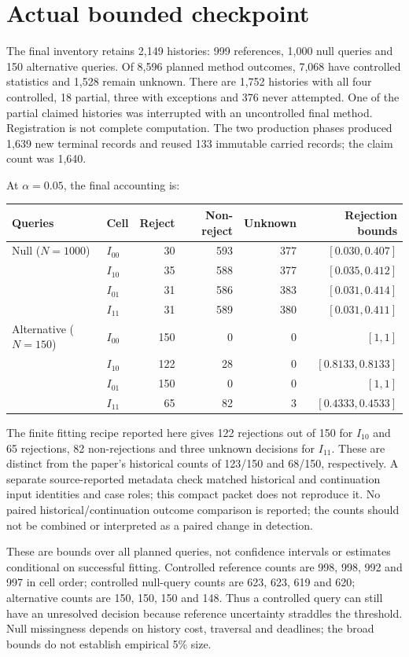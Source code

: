 \section*{Actual bounded checkpoint}
The final inventory retains 2,149 histories: 999 references, 1,000 null
queries and 150 alternative queries. Of 8,596 planned method outcomes,
7,068 have controlled statistics and 1,528 remain unknown. There are 1,752
histories with all four controlled, 18 partial, three with exceptions and
376 never attempted. One of the partial claimed histories was interrupted with
an uncontrolled final method. Registration is not complete computation.
The two production phases produced 1,639 new terminal records and reused
133 immutable carried records; the claim count was 1,640.

At $\alpha=0.05$, the final accounting is:
\begin{center}
\begin{tabular}{llrrrr}\toprule
Queries & Cell & Reject & Non-reject & Unknown & Rejection bounds\\\midrule
Null ($N=1000$)&$I_{00}$&30&593&377&$[0.030,0.407]$\\
&$I_{10}$&35&588&377&$[0.035,0.412]$\\
&$I_{01}$&31&586&383&$[0.031,0.414]$\\
&$I_{11}$&31&589&380&$[0.031,0.411]$\\\midrule
Alternative ($N=150$)&$I_{00}$&150&0&0&$[1,1]$\\
&$I_{10}$&122&28&0&$[0.8133,0.8133]$\\
&$I_{01}$&150&0&0&$[1,1]$\\
&$I_{11}$&65&82&3&$[0.4333,0.4533]$\\\bottomrule
\end{tabular}
\end{center}
The finite fitting recipe reported here gives 122 rejections out of 150
for $I_{10}$ and 65 rejections, 82 non-rejections and three unknown decisions
for $I_{11}$. These are distinct from the paper's historical counts of
123/150 and 68/150, respectively. A separate source-reported metadata check
matched historical and continuation input identities and case roles; this
compact packet does not reproduce it. No paired historical/continuation
outcome comparison is reported; the counts should not be combined or
interpreted as a paired change in detection.

These are bounds over all planned queries, not confidence intervals or
estimates conditional on successful fitting. Controlled reference counts
are 998, 998, 992 and 997 in cell order; controlled null-query counts are
623, 623, 619 and 620; alternative counts are 150, 150, 150 and 148.
Thus a controlled query can still have an unresolved decision because
reference uncertainty straddles the threshold. Null missingness depends
on history cost, traversal and deadlines; the broad bounds do not establish
empirical 5\% size.

